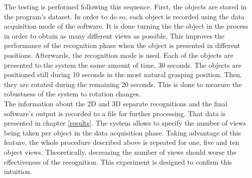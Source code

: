 		The testing is performed following this sequence. 
		First, the objects are stored in the program's dataset. 
		In order to do so, each object is recorded using the data acquisition mode of the software. 
		It is done turning the the object in the process in order to obtain as many different views as possible. 
		This improves the performance of the recognition phase when the object is presented in different positions. 
		Afterwards, the recognition mode is used.
		Each of the objects are presented to the system the same amount of time, 30 seconds. 
		The objects are positioned still during 10 seconds in the most natural grasping position. 
		Then, they are rotated during the remaining 20 seconds. 
		This is done to measure the robustness of the system to rotation changes. 
\\

		The information about the 2D and 3D separate recognitions and the final software's output is recorded to a file for further processing. 
		That data is presented in chapter \ref{results}.
		The system allows to specify the number of views being taken per object in the data acquisition phase. 
		Taking advantage of this feature, the whole procedure described above is repeated for one, five and ten object views.
		Theoretically, decreasing the number of views should worse the effectiveness of the recognition. %
		This experiment is designed to confirm this intuition. 
		\\%




